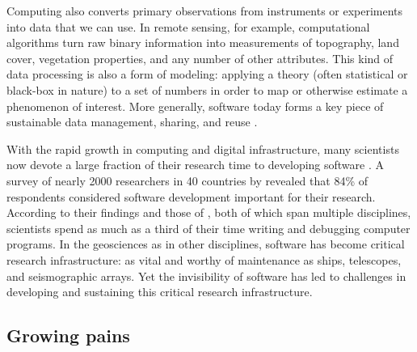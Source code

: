 \documentclass[12pt]{amsart}
\begin{document}
Computing also converts primary observations from instruments or experiments into data that we can use. In remote sensing, for example, computational algorithms turn raw binary information into measurements of topography, land cover, vegetation properties, and any number of other attributes. This kind of data processing is also a form of modeling: applying a theory (often statistical or black-box in nature) to a set of numbers in order to map or otherwise estimate a phenomenon of interest. More generally, software today forms a key piece of sustainable data management, sharing, and reuse \citep[e.g.,][]{hsu2015data}.

With the rapid growth in computing and digital infrastructure, many scientists now devote a large fraction of their research time to developing software \citep{hannay2009scientists,prabhu2011survey,wilson2014best,singh2016unsung,pinto2018scientists}. A survey of nearly 2000 researchers in 40 countries by \citet{hannay2009scientists} revealed that 84\% of respondents considered software development important for their research. According to their findings and those of \citet{prabhu2011survey}, both of which span multiple disciplines, scientists spend as much as a third of their time writing and debugging computer programs. In the geosciences as in other disciplines, software has become critical research infrastructure: as vital and worthy of maintenance as ships, telescopes, and seismographic arrays. Yet the invisibility of software \citep[e.g.,][]{eghbal2016roads} has led to challenges in developing and sustaining this critical research infrastructure.


\subsection{Growing pains}
\end{document}
